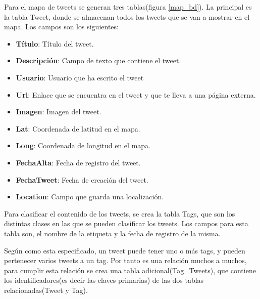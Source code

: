 \vspace{5 mm}

Para el mapa de tweets se generan tres tablas(figura \ref{map_bd}). La principal es la tabla Tweet, donde se almacenan todos los tweets que se van a mostrar en el mapa. Los campos son los siguientes:


\begin{itemize}

\item \textbf{Título}: Título del tweet.
\item \textbf{Descripción}: Campo de texto que contiene el tweet.
\item \textbf{Usuario}: Usuario que ha escrito el tweet
\item \textbf{Url}: Enlace que se encuentra en el tweet y que te lleva a una página externa.
\item \textbf{Imagen}: Imagen del tweet.
\item \textbf{Lat}: Coordenada de latitud en el mapa.
\item \textbf{Long}: Coordenada de longitud en el mapa.
\item \textbf{FechaAlta}: Fecha de registro del tweet.
\item \textbf{FechaTweet}: Fecha de creación del tweet.
\item \textbf{Location}: Campo que guarda una localización.

\end{itemize}


\vspace{5 mm}


Para clasificar el contenido de los tweets, se crea la tabla Tags, que son los distintas clases en las que se pueden clasificar los tweets. Los campos para esta tabla son, el nombre de la etiqueta y la fecha de registro de la misma.

\vspace{5 mm}

Según como esta especificado, un tweet puede tener uno o más tags, y pueden pertenecer varios tweets a un tag. Por tanto es una relación muchos a muchos, para cumplir esta relación se crea una tabla adicional(Tag\_Tweets), que contiene los identificadores(es decir las claves primarias) de las dos tablas relacionadas(Tweet y Tag).









